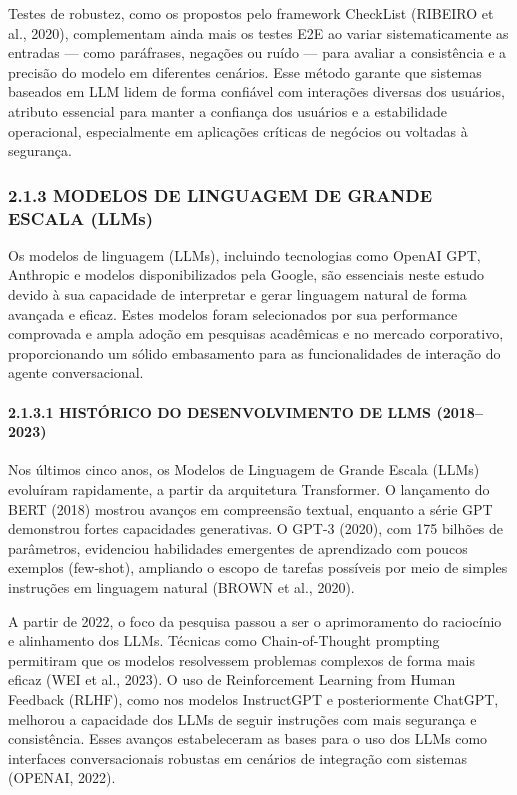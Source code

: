 \documentclass[
]{article}
\begin{document}
Testes de robustez, como os propostos pelo framework CheckList (RIBEIRO
et al., 2020), complementam ainda mais os testes E2E ao variar
sistematicamente as entradas --- como paráfrases, negações ou ruído ---
para avaliar a consistência e a precisão do modelo em diferentes
cenários. Esse método garante que sistemas baseados em LLM lidem de
forma confiável com interações diversas dos usuários, atributo essencial
para manter a confiança dos usuários e a estabilidade operacional,
especialmente em aplicações críticas de negócios ou voltadas à
segurança.

\subsubsection{2.1.3 MODELOS DE LINGUAGEM DE GRANDE ESCALA
(LLMs)}\label{modelos-de-linguagem-de-grande-escala-llms}

Os modelos de linguagem (LLMs), incluindo tecnologias como OpenAI GPT,
Anthropic e modelos disponibilizados pela Google, são essenciais neste
estudo devido à sua capacidade de interpretar e gerar linguagem natural
de forma avançada e eficaz. Estes modelos foram selecionados por sua
performance comprovada e ampla adoção em pesquisas acadêmicas e no
mercado corporativo, proporcionando um sólido embasamento para as
funcionalidades de interação do agente conversacional.

\paragraph{2.1.3.1 HISTÓRICO DO DESENVOLVIMENTO DE LLMS
(2018--2023)}\label{histuxf3rico-do-desenvolvimento-de-llms-20182023}

Nos últimos cinco anos, os Modelos de Linguagem de Grande Escala (LLMs)
evoluíram rapidamente, a partir da arquitetura Transformer. O lançamento
do BERT (2018) mostrou avanços em compreensão textual, enquanto a série
GPT demonstrou fortes capacidades generativas. O GPT-3 (2020), com 175
bilhões de parâmetros, evidenciou habilidades emergentes de aprendizado
com poucos exemplos (few-shot), ampliando o escopo de tarefas possíveis
por meio de simples instruções em linguagem natural (BROWN et al.,
2020).

A partir de 2022, o foco da pesquisa passou a ser o aprimoramento do
raciocínio e alinhamento dos LLMs. Técnicas como Chain-of-Thought
prompting permitiram que os modelos resolvessem problemas complexos de
forma mais eficaz (WEI et al., 2023). O uso de Reinforcement Learning
from Human Feedback (RLHF), como nos modelos InstructGPT e
posteriormente ChatGPT, melhorou a capacidade dos LLMs de seguir
instruções com mais segurança e consistência. Esses avanços
estabeleceram as bases para o uso dos LLMs como interfaces
conversacionais robustas em cenários de integração com sistemas (OPENAI,
2022).
\end{document}
